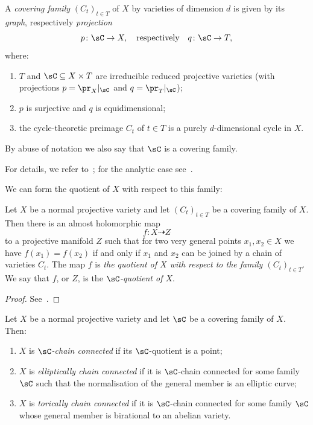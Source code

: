 \begin{defi}\label{def:main4.1}
A \emph{covering family} $(C_t)_{t \in T}$ of $X$ by varieties of dimension $d$ is given by its \emph{graph}, respectively \emph{projection}
\[
p\colon \sC \to X,\quad \text{respectively}\quad q \colon \sC \to T,
\]
where:
\begin{enumerate}\alphenumi
\item \label{list-4.1.1}$T$ and $\sC \subseteq X \times T$ are irreducible reduced projective varieties (with projections $p = \pr_X|_\sC$ and $q = \pr_T|_\sC$);
\item \label{list-4.1.2}$p$ is surjective and $q$ is equidimensional;
\item \label{list-4.1.3}the cycle-theoretic preimage $C_t$ of $t \in T$ is a purely $d$-dimensional cycle in $X$.
\end{enumerate}
By abuse of notation we also say that $\sC$ is a covering family.
\end{defi}

For details, we refer to~\cite[Section I.4]{Kol96}; for the analytic case see~\cite{Bar75,BM14}.

We can form the quotient of $X$ with respect to this family:

\begin{prop}\label{quot}
Let $X$ be a normal projective variety and let $(C_t)_{t \in T}$ be a covering family of $X$. Then there is an almost holomorphic map
\[
f\colon X \dasharrow Z
\]
to a projective manifold $Z$ such that for two very general points $x_1,x_2 \in X$ we have $f(x_1) = f(x_2)$ if and only if $x_1 $ and $x_2$ can be joined by a chain of varieties $C_t$. The map $f$ is \emph{the quotient of $X$ with respect to the family $(C_t)_{t\in T}$}. We say that $f$, or $Z$, is the \emph{$\sC$-quotient of $X$}.
\end{prop}

\begin{proof}
See~\cite{Ca81,Ca04}.
\end{proof}

\begin{defi}\label{def:main4.3}
Let $X$ be a normal projective variety and let $\sC$ be a covering family of $X$. Then:
\begin{enumerate}\alphenumi
\item \label{list-4.3.1}$X$ is \emph{$\sC$-chain connected} if its $\sC$-quotient is a point;
\item \label{list-4.3.2}$X$ is \emph{elliptically chain connected} if it is $\sC$-chain connected for some family $\sC$ such that the normalisation of the general member is an elliptic curve;
\item \label{list-4.3.3}$X$ is \emph{torically chain connected} if it is $\sC$-chain connected for some family $\sC$ whose general member is birational to an abelian variety.
\end{enumerate}
\end{defi}

